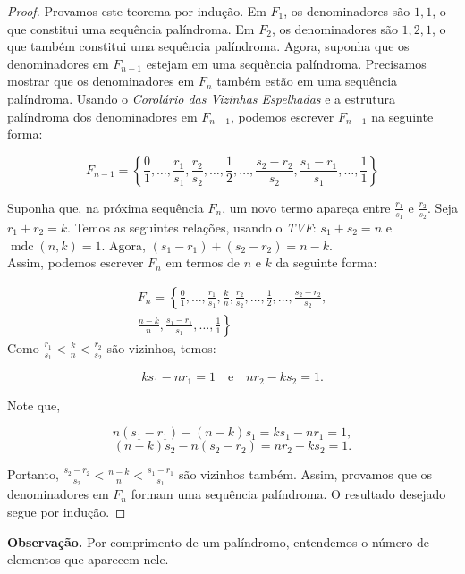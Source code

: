 \documentclass{hipatia}
\theoremstyle{definition} %
\begin{document}
\begin{proof}
Provamos este teorema por indução. Em \(F_{1}\), os denominadores são \(1, 1\), o que constitui uma sequência palíndroma. Em \(F_{2}\), os denominadores são \(1, 2, 1\), o que também constitui uma sequência palíndroma. Agora, suponha que os denominadores em \(F_{n-1}\) estejam em uma sequência palíndroma. Precisamos mostrar que os denominadores em \(F_{n}\) também estão em uma sequência palíndroma. Usando o \textit{Corolário das Vizinhas Espelhadas} e a estrutura palíndroma dos denominadores em \(F_{n-1}\), podemos escrever \(F_{n-1}\) na seguinte forma:

\[
F_{n-1} = \left\{ \frac{0}{1}, \ldots, \frac{r_{1}}{s_{1}}, \frac{r_{2}}{s_{2}}, \ldots, \frac{1}{2}, \ldots, \frac{s_{2} - r_{2}}{s_{2}}, \frac{s_{1} - r_{1}}{s_{1}}, \ldots, \frac{1}{1} \right\}
\]

Suponha que, na próxima sequência \(F_{n}\), um novo termo apareça entre \(\frac{r_{1}}{s_{1}}\) e \(\frac{r_{2}}{s_{2}}\). Seja \(r_{1} + r_{2} = k\). Temos as seguintes relações, usando o \textit{TVF}: \(s_{1} + s_{2} = n\) e \(\operatorname{mdc}(n, k) = 1\).
Agora, \((s_{1} - r_{1}) + (s_{2} - r_{2}) = n - k\).\\
Assim, podemos escrever \(F_{n}\) em termos de \(n\) e \(k\) da seguinte forma:

\begin{multline*}
F_{n} = \left\{ \frac{0}{1}, \ldots, \frac{r_{1}}{s_{1}}, \frac{k}{n}, \frac{r_{2}}{s_{2}}, \ldots, \frac{1}{2}, \ldots, \frac{s_{2} - r_{2}}{s_{2}}, \right. \\
\left. \frac{n - k}{n}, \frac{s_{1} - r_{1}}{s_{1}}, \ldots, \frac{1}{1} \right\}
\end{multline*}
Como \(\frac{r_{1}}{s_{1}} < \frac{k}{n} < \frac{r_{2}}{s_{2}}\) são vizinhos, temos:

\[
k s_{1} - n r_{1} = 1 \quad \text{e} \quad n r_{2} - k s_{2} = 1.
\]

Note que,

\[
n(s_{1} - r_{1}) - (n - k)s_{1} = k s_{1} - n r_{1} = 1,
\]
\[
(n - k)s_{2} - n(s_{2} - r_{2}) = n r_{2} - k s_{2} = 1.
\]

Portanto, \(\frac{s_{2} - r_{2}}{s_{2}} < \frac{n - k}{n} < \frac{s_{1} - r_{1}}{s_{1}}\) são vizinhos também. Assim, provamos que os denominadores em \(F_{n}\) formam uma sequência palíndroma. O resultado desejado segue por indução.
\end{proof}

\noindent\textbf{Observação.} Por comprimento de um palíndromo, entendemos o número de elementos que aparecem nele.
\end{document}
